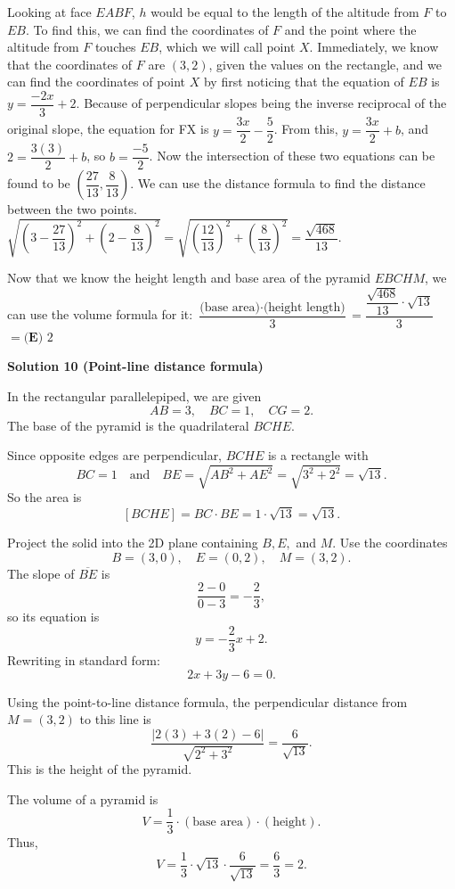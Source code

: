 \begin{enumerate}
 Looking at face $EABF$, $h$ would be equal to the length of the altitude from $F$ to $EB$. To find this, we can find the coordinates of $F$ and the point where the altitude from $F$ touches $EB$, which we will call point $X$. Immediately, we know that the coordinates of $F$ are $(3,2)$, given the values on the rectangle, and we can find the coordinates of point $X$ by first noticing that the equation of $EB$ is $y = \dfrac{-2x}{3}+2$. Because of perpendicular slopes being the inverse reciprocal of the original slope, the equation for FX is $y = \dfrac{3x}{2}-\dfrac{5}{2}$. From this, $y = \dfrac{3x}{2}+b$, and $2=\dfrac{3(3)}{2}+b$, so $b = \dfrac{-5}{2}$. Now the intersection of these two equations can be found to be $(\dfrac{27}{13},\dfrac{8}{13})$. We can use the distance formula to find the distance between the two points. $\sqrt{(3-\dfrac{27}{13})^2 + (2-\dfrac{8}{13})^2} = \sqrt{(\dfrac{12}{13})^2+(\dfrac{8}{13})^2} = \dfrac{\sqrt{468}}{13}$. 

 Now that we know the height length and base area of the pyramid $EBCHM$, we can use the volume formula for it: $\dfrac{\text{(base area)} \cdot \text{(height length)}}{3} = \dfrac{\dfrac{\sqrt{468}}{13} \cdot \sqrt{13}}{3}$ $= \boxed{\textbf{(E) } 2}$




\textbf{Solution 10 (Point-line distance formula)}

In the rectangular parallelepiped, we are given
 \[AB = 3,\quad BC = 1,\quad CG = 2.\]The base of the pyramid is the quadrilateral $BCHE$.

 Since opposite edges are perpendicular, $BCHE$ is a rectangle with
 \[BC = 1 \quad \text{and} \quad BE = \sqrt{AB^2 + AE^2} = \sqrt{3^2 + 2^2} = \sqrt{13}.\]So the area is
 \[[BCHE] = BC \cdot BE = 1 \cdot \sqrt{13} = \sqrt{13}.\]

 Project the solid into the 2D plane containing $B, E,$ and $M$. Use the coordinates
 \[B = (3,0),\quad E = (0,2),\quad M = (3,2).\]The slope of $\overline{BE}$ is
 \[\frac{2-0}{0-3} = -\frac{2}{3},\]so its equation is
 \[y = -\frac{2}{3}x + 2.\]Rewriting in standard form:
 \[2x + 3y - 6 = 0.\]

 Using the point-to-line distance formula, the perpendicular distance from $M = (3,2)$ to this line is
 \[\frac{|2(3) + 3(2) - 6|}{\sqrt{2^2 + 3^2}} = \frac{6}{\sqrt{13}}.\]This is the height of the pyramid.

 The volume of a pyramid is
 \[V = \frac{1}{3} \cdot (\text{base area}) \cdot (\text{height}).\]Thus,
 \[V = \frac{1}{3} \cdot \sqrt{13} \cdot \frac{6}{\sqrt{13}} = \frac{6}{3} = 2.\]




\end{enumerate}
